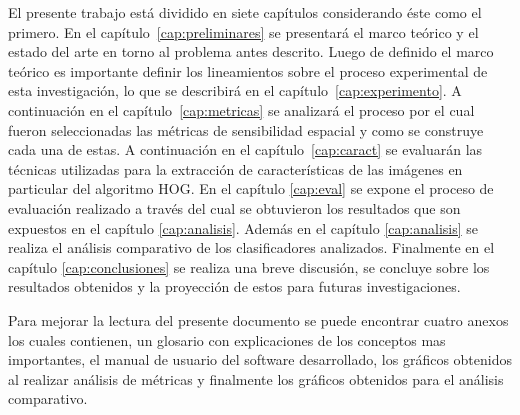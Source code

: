 
El presente trabajo está dividido en siete capítulos considerando éste como el primero. En el capítulo~\ref{cap:preliminares} se presentará el marco teórico y el estado del arte en torno al problema antes descrito. Luego de definido el marco teórico es importante definir los lineamientos sobre el proceso experimental de esta investigación, lo que se describirá en el capítulo~\ref{cap:experimento}. A continuación en el capítulo~\ref{cap:metricas} se analizará el proceso por el cual fueron seleccionadas las métricas de sensibilidad espacial y como se construye cada una de estas. A continuación en el capítulo~\ref{cap:caract} se evaluarán las técnicas utilizadas para la extracción de características de las imágenes en particular del algoritmo HOG. En el capítulo \ref{cap:eval} se expone el proceso de evaluación realizado a través del  cual se obtuvieron los resultados que son expuestos en el capítulo \ref{cap:analisis}. Además en el capítulo \ref{cap:analisis} se realiza el análisis comparativo de los clasificadores analizados. Finalmente en el capítulo \ref{cap:conclusiones} se realiza una breve discusión, se concluye sobre los resultados obtenidos y la proyección de estos para futuras investigaciones.

Para mejorar la lectura del presente documento se puede encontrar cuatro anexos los cuales contienen, un glosario con explicaciones de los conceptos mas importantes, el manual de usuario del software desarrollado, los gráficos obtenidos al realizar análisis de métricas y finalmente los gráficos obtenidos para el análisis comparativo. 
